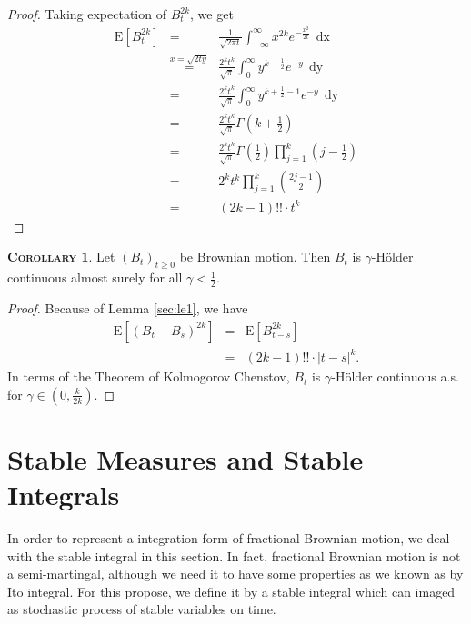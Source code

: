 \documentclass[a4paper, twoside, 11pt]{article}
\theoremstyle{definition}
\newtheorem{corollary}[definition]{\scshape Corollary}
\begin{document}
\begin{proof}
  Taking expectation of $B_t^{2k}$, we get
  \begin{eqnarray*}
	\mathrm{E}[B_t^{2k}] &=& \frac{1}{\sqrt{2\pi t}}\int_{-\infty}^{\infty} x^{2k} e^{-\frac{x^2}{2t}}\,\mathop{dx}\\
	&\overset{x=\sqrt{2ty}}{=}& \frac{2^kt^k}{\sqrt{\pi}} \int_0^{\infty} y^{k-\frac{1}{2}} e^{-y}\,\mathop{dy}\\
	&=& \frac{2^kt^k}{\sqrt{\pi}} \int_0^{\infty} y^{k+\frac{1}{2}-1} e^{-y}\,\mathop{dy}\\
	&=& \frac{2^kt^k}{\sqrt{\pi}} \Gamma(k + \frac{1}{2})\\
	&=& \frac{2^kt^k}{\sqrt{\pi}} \Gamma(\frac{1}{2})\prod_{j=1}^k(j-\frac{1}{2}) \\
	&=& 2^k t^k\prod_{j=1}^k(\frac{2j-1}{2}) \\
	&=& (2k - 1)!!\cdot t^k
  \end{eqnarray*}
\end{proof}

\begin{corollary}
  Let $(B_t)_{t\ge 0}$ be Brownian motion. Then $B_t$ is $\gamma$-H\"older continuous almost surely for all $\gamma < \frac{1}{2}$.
\end{corollary}

\begin{proof}
  Because of Lemma \ref{sec:le1}, we have
  \begin{eqnarray*}
	\mathrm{E}[(B_t-B_s)^{2k}] &=& \mathrm{E}[B_{t-s}^{2k}]\\
	&=& (2k - 1)!! \cdot |t-s|^{k}.
  \end{eqnarray*}
  In terms of the Theorem of Kolmogorov Chenstov, $B_t$ is $\gamma$-H\"older continuous a.s. for $\gamma \in (0, \frac{k}{2k})$.
\end{proof}

\newpage

\section{Stable Measures and Stable Integrals}
In order to represent a integration form of fractional Brownian motion, we deal with the stable integral in this section. In fact, fractional Brownian motion is not a semi-martingal, although we need it to have some properties as we known as by Ito integral. For this propose, we define it by a 
stable integral which can imaged as stochastic process of stable variables on time.
\end{document}
